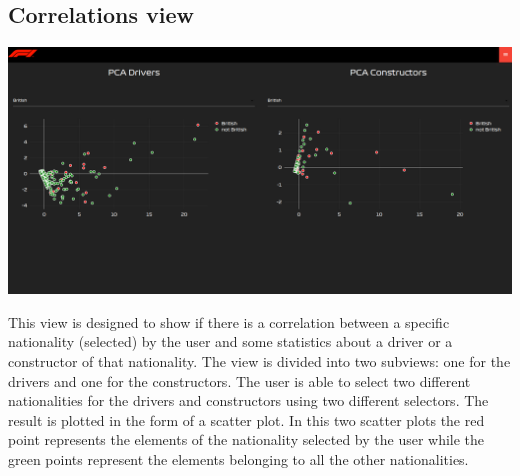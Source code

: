 \documentclass[11pt,twocolumn,letterpaper]{article}
\begin{document}
\subsection{Correlations view}
\begin{center}
	\centering
	\includegraphics[width=\columnwidth]{correlations}
\end{center}
This view is designed to show if there is a correlation between a specific nationality (selected) by the user and some statistics about a driver or a 
constructor of that nationality. The view is divided into two subviews: one for the drivers and one for the constructors. The user is able to select two different nationalities
for the drivers and constructors using two different selectors. The result is plotted in the form of a scatter plot. In this two scatter plots the red point represents the elements
of the nationality selected by the user while the green points represent the elements belonging to all the other nationalities.
\end{document}
